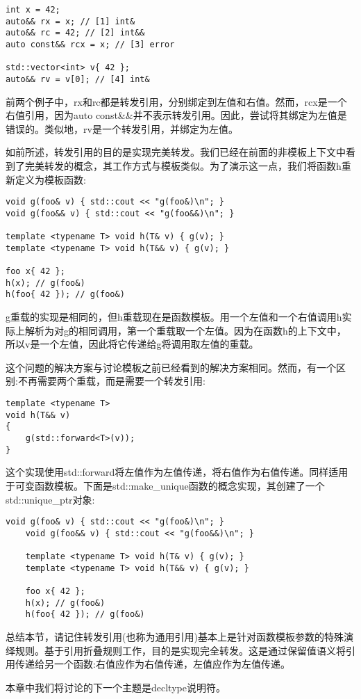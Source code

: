 \begin{lstlisting}[style=styleCXX]
int x = 42;
auto&& rx = x; // [1] int&
auto&& rc = 42; // [2] int&&
auto const&& rcx = x; // [3] error

std::vector<int> v{ 42 };
auto&& rv = v[0]; // [4] int&
\end{lstlisting}

前两个例子中，rx和rc都是转发引用，分别绑定到左值和右值。然而，rcx是一个右值引用，因为auto const\&\&并不表示转发引用。因此，尝试将其绑定为左值是错误的。类似地，rv是一个转发引用，并绑定为左值。

如前所述，转发引用的目的是实现完美转发。我们已经在前面的非模板上下文中看到了完美转发的概念，其工作方式与模板类似。为了演示这一点，我们将函数h重新定义为模板函数:

\begin{lstlisting}[style=styleCXX]
void g(foo& v) { std::cout << "g(foo&)\n"; }
void g(foo&& v) { std::cout << "g(foo&&)\n"; }

template <typename T> void h(T& v) { g(v); }
template <typename T> void h(T&& v) { g(v); }

foo x{ 42 };
h(x); // g(foo&)
h(foo{ 42 }); // g(foo&)
\end{lstlisting}

g重载的实现是相同的，但h重载现在是函数模板。用一个左值和一个右值调用h实际上解析为对g的相同调用，第一个重载取一个左值。因为在函数h的上下文中，所以v是一个左值，因此将它传递给g将调用取左值的重载。

这个问题的解决方案与讨论模板之前已经看到的解决方案相同。然而，有一个区别:不再需要两个重载，而是需要一个转发引用:

\begin{lstlisting}[style=styleCXX]
template <typename T>
void h(T&& v)
{
	g(std::forward<T>(v));
}
\end{lstlisting}

这个实现使用std::forward将左值作为左值传递，将右值作为右值传递。同样适用于可变函数模板。下面是std::make\_unique函数的概念实现，其创建了一个std::unique\_ptr对象:

\begin{lstlisting}[style=styleCXX]
	void g(foo& v) { std::cout << "g(foo&)\n"; }
	void g(foo&& v) { std::cout << "g(foo&&)\n"; }
	
	template <typename T> void h(T& v) { g(v); }
	template <typename T> void h(T&& v) { g(v); }
	
	foo x{ 42 };
	h(x); // g(foo&)
	h(foo{ 42 }); // g(foo&)
\end{lstlisting}

总结本节，请记住转发引用(也称为通用引用)基本上是针对函数模板参数的特殊演绎规则。基于引用折叠规则工作，目的是实现完全转发。这是通过保留值语义将引用传递给另一个函数:右值应作为右值传递，左值应作为左值传递。

本章中我们将讨论的下一个主题是decltype说明符。













